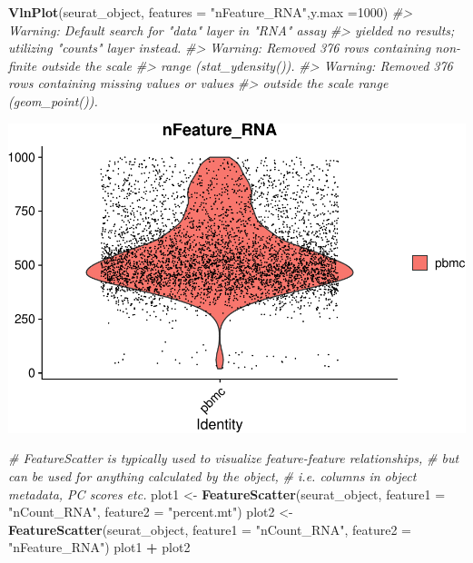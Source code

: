 \documentclass[
]{book}
\newenvironment{Shaded}{\begin{snugshade}}{\end{snugshade}}
\newcommand{\AttributeTok}[1]{\textcolor[rgb]{0.13,0.29,0.53}{#1}}
\newcommand{\CommentTok}[1]{\textcolor[rgb]{0.56,0.35,0.01}{\textit{#1}}}
\newcommand{\DecValTok}[1]{\textcolor[rgb]{0.00,0.00,0.81}{#1}}
\newcommand{\FunctionTok}[1]{\textcolor[rgb]{0.13,0.29,0.53}{\textbf{#1}}}
\newcommand{\NormalTok}[1]{#1}
\newcommand{\OtherTok}[1]{\textcolor[rgb]{0.56,0.35,0.01}{#1}}
\newcommand{\SpecialCharTok}[1]{\textcolor[rgb]{0.81,0.36,0.00}{\textbf{#1}}}
\newcommand{\StringTok}[1]{\textcolor[rgb]{0.31,0.60,0.02}{#1}}
\begin{document}
\begin{Shaded}
\begin{Highlighting}[]
\FunctionTok{VlnPlot}\NormalTok{(seurat\_object, }\AttributeTok{features =} \StringTok{"nFeature\_RNA"}\NormalTok{,}\AttributeTok{y.max =}\DecValTok{1000}\NormalTok{)}
\CommentTok{\#\textgreater{} Warning: Default search for "data" layer in "RNA" assay}
\CommentTok{\#\textgreater{} yielded no results; utilizing "counts" layer instead.}
\CommentTok{\#\textgreater{} Warning: Removed 376 rows containing non{-}finite outside the scale}
\CommentTok{\#\textgreater{} range (\textasciigrave{}stat\_ydensity()\textasciigrave{}).}
\CommentTok{\#\textgreater{} Warning: Removed 376 rows containing missing values or values}
\CommentTok{\#\textgreater{} outside the scale range (\textasciigrave{}geom\_point()\textasciigrave{}).}
\end{Highlighting}
\end{Shaded}

\includegraphics{scRNAseqInR_ABACBS_2024_Doco_files/figure-latex/qc2-3.pdf}

\begin{Shaded}
\begin{Highlighting}[]


\CommentTok{\# FeatureScatter is typically used to visualize feature{-}feature relationships, }
\CommentTok{\# but can be used for anything calculated by the object, }
\CommentTok{\# i.e. columns in object metadata, PC scores etc.}
\NormalTok{plot1 }\OtherTok{\textless{}{-}} \FunctionTok{FeatureScatter}\NormalTok{(seurat\_object, }\AttributeTok{feature1 =} \StringTok{"nCount\_RNA"}\NormalTok{, }\AttributeTok{feature2 =} \StringTok{"percent.mt"}\NormalTok{) }
\NormalTok{plot2 }\OtherTok{\textless{}{-}} \FunctionTok{FeatureScatter}\NormalTok{(seurat\_object, }\AttributeTok{feature1 =} \StringTok{"nCount\_RNA"}\NormalTok{, }\AttributeTok{feature2 =} \StringTok{"nFeature\_RNA"}\NormalTok{) }
\NormalTok{plot1 }\SpecialCharTok{+}\NormalTok{ plot2}
\end{Highlighting}
\end{Shaded}
\end{document}
